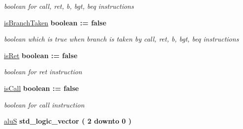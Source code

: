 \begin{DoxyCompactItemize}
\begin{DoxyCompactList}\small\item\em boolean for call, ret, b, bgt, beq instructions \end{DoxyCompactList}\item 
\hypertarget{class_simple_r_i_s_c_1_1main_a9febe4603c9484216f7bd07c9ac5465a}{\hyperlink{class_simple_r_i_s_c_1_1main_a9febe4603c9484216f7bd07c9ac5465a}{is\-Branch\-Taken} {\bfseries \textcolor{comment}{boolean}\textcolor{vhdlchar}{ }\textcolor{vhdlchar}{ }\textcolor{vhdlchar}{\-:}\textcolor{vhdlchar}{=}\textcolor{vhdlchar}{ }\textcolor{vhdlchar}{false}\textcolor{vhdlchar}{ }} }\label{class_simple_r_i_s_c_1_1main_a9febe4603c9484216f7bd07c9ac5465a}

\begin{DoxyCompactList}\small\item\em boolean which is true when branch is taken by call, ret, b, bgt, beq instructions \end{DoxyCompactList}\item 
\hypertarget{class_simple_r_i_s_c_1_1main_a4326436a10c51413d01ebb2c8ab4d9a6}{\hyperlink{class_simple_r_i_s_c_1_1main_a4326436a10c51413d01ebb2c8ab4d9a6}{is\-Ret} {\bfseries \textcolor{comment}{boolean}\textcolor{vhdlchar}{ }\textcolor{vhdlchar}{ }\textcolor{vhdlchar}{\-:}\textcolor{vhdlchar}{=}\textcolor{vhdlchar}{ }\textcolor{vhdlchar}{false}\textcolor{vhdlchar}{ }} }\label{class_simple_r_i_s_c_1_1main_a4326436a10c51413d01ebb2c8ab4d9a6}

\begin{DoxyCompactList}\small\item\em boolean for ret instruction \end{DoxyCompactList}\item 
\hypertarget{class_simple_r_i_s_c_1_1main_a374d3926d6376e22fc6ef74d586f36ea}{\hyperlink{class_simple_r_i_s_c_1_1main_a374d3926d6376e22fc6ef74d586f36ea}{is\-Call} {\bfseries \textcolor{comment}{boolean}\textcolor{vhdlchar}{ }\textcolor{vhdlchar}{ }\textcolor{vhdlchar}{\-:}\textcolor{vhdlchar}{=}\textcolor{vhdlchar}{ }\textcolor{vhdlchar}{false}\textcolor{vhdlchar}{ }} }\label{class_simple_r_i_s_c_1_1main_a374d3926d6376e22fc6ef74d586f36ea}

\begin{DoxyCompactList}\small\item\em boolean for call instruction \end{DoxyCompactList}\item 
\hypertarget{class_simple_r_i_s_c_1_1main_a6ec50893678c7daa0e7fe1c555e11a08}{\hyperlink{class_simple_r_i_s_c_1_1main_a6ec50893678c7daa0e7fe1c555e11a08}{alu\-S} {\bfseries \textcolor{comment}{std\-\_\-logic\-\_\-vector}\textcolor{vhdlchar}{ }\textcolor{vhdlchar}{(}\textcolor{vhdlchar}{ } \textcolor{vhdldigit}{2} \textcolor{vhdlchar}{ }\textcolor{vhdlchar}{ }\textcolor{vhdlchar}{ }\textcolor{vhdlkeyword}{downto}\textcolor{vhdlchar}{ }\textcolor{vhdlchar}{ }\textcolor{vhdlchar}{ } \textcolor{vhdldigit}{0} \textcolor{vhdlchar}{ }\textcolor{vhdlchar}{)}\textcolor{vhdlchar}{ }} }\label{class_simple_r_i_s_c_1_1main_a6ec50893678c7daa0e7fe1c555e11a08}


\end{DoxyCompactItemize}

